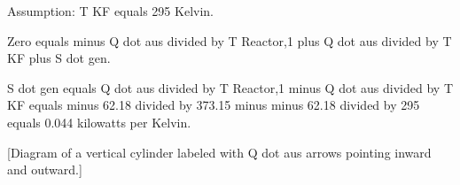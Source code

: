 Assumption: T KF equals 295 Kelvin.  

Zero equals minus Q dot aus divided by T Reactor,1 plus Q dot aus divided by T KF plus S dot gen.  

S dot gen equals Q dot aus divided by T Reactor,1 minus Q dot aus divided by T KF equals minus 62.18 divided by 373.15 minus minus 62.18 divided by 295 equals 0.044 kilowatts per Kelvin.  

[Diagram of a vertical cylinder labeled with Q dot aus arrows pointing inward and outward.]